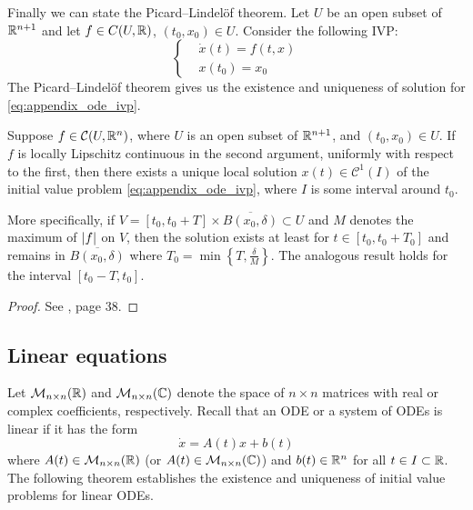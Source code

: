 Finally we can state the Picard--Lindelöf theorem. Let $U$ be an open subset of
$\mathbb{R}^{n+1}$ and let $f \in C(U, \mathbb{R})$, $(t_0, x_0) \in U$. Consider the
following IVP:
\begin{equation} \label{eq:appendix_ode_ivp}
	\left\{
	\begin{aligned}
		&\dot{x}(t) = f(t, x) \\
		&x(t_0) = x_0
	\end{aligned}
	\right.
\end{equation}
The Picard--Lindelöf theorem gives us the existence and uniqueness of solution
for \eqref{eq:appendix_ode_ivp}.

\begin{theorem}
	\label{teo:picard_lindelof} Suppose $f \in \mathcal{C}(U, \mathbb{R}^n)$, where
	$U$ is an open subset of $\mathbb{R}^{n+1}$, and $(t_0, x_0) \in U$. If $f$
	is locally Lipschitz continuous in the second argument, uniformly with
	respect to the first, then there exists a unique local solution $x(t)
	\in \mathcal{C}^1(I)$ of the initial value problem
	\eqref{eq:appendix_ode_ivp}, where $I$ is some interval around $t_0$. 
	
	More specifically, if $V = [t_0, t_0 + T] \times \overline{B(x_0,
	\delta)} \subset U$ and $M$ denotes the maximum of $\abs{f}$ on $V$, then
	the solution exists at least for $t \in [t_0, t_0 + T_0]$ and remains in
	$\overline{B(x_0, \delta)}$ where $T_0 = \min{\left\{ T,
	\frac{\delta}{M} \right\}}$. The analogous result holds for the interval
	$[t_0 - T, t_0]$.
\end{theorem}
\begin{proof}
	See \cite{teschl2012odes}, page 38.
\end{proof}


\subsection{Linear equations}

Let $\mathcal{M}_{n \times n}(\mathbb{R})$ and $\mathcal{M}_{n \times n}(\mathbb{C})$
denote the space of $n \times n$ matrices with real or complex coefficients,
respectively. Recall that an ODE or a system of ODEs is linear if it has the
form
\begin{equation} \label{eq:linear_ode}
	\dot{x} = A(t) x + b(t)
\end{equation}
where $A(t) \in \mathcal{M}_{n \times n}(\mathbb{R})$ (or $A(t) \in \mathcal{M}_{n
\times n}(\mathbb{C})$) and $b(t) \in \mathbb{R}^n$ for all $t \in I \subset \mathbb{R}$. The
following theorem establishes the existence and uniqueness of initial value
problems for linear ODEs.

